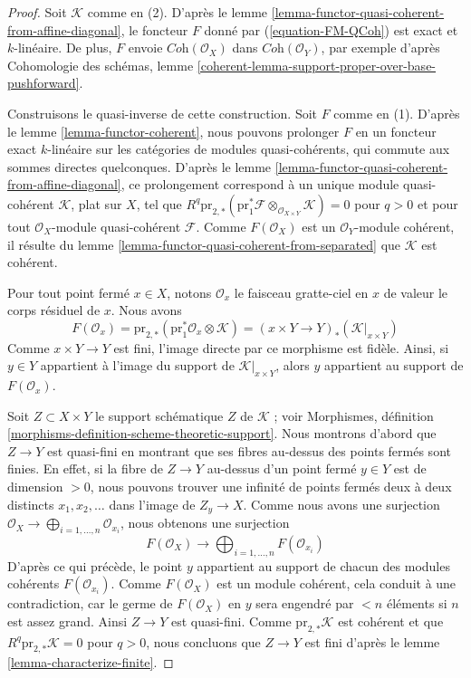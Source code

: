 \begin{proof}
Soit $\mathcal{K}$ comme en (2). D'après le
lemme \ref{lemma-functor-quasi-coherent-from-affine-diagonal}, le foncteur
$F$ donné par (\ref{equation-FM-QCoh}) est exact et $k$-linéaire.
De plus, $F$ envoie $\textit{Coh}(\mathcal{O}_X)$ dans
$\textit{Coh}(\mathcal{O}_Y)$, par exemple d'après
Cohomologie des schémas, lemme
\ref{coherent-lemma-support-proper-over-base-pushforward}.

\medskip\noindent
Construisons le quasi-inverse de cette construction. Soit $F$ comme en (1).
D'après le lemme \ref{lemma-functor-coherent}, nous pouvons prolonger $F$ en
un foncteur exact $k$-linéaire sur les catégories de modules quasi-cohérents,
qui commute aux sommes directes quelconques.
D'après le lemme \ref{lemma-functor-quasi-coherent-from-affine-diagonal}, ce
prolongement correspond à un unique module quasi-cohérent $\mathcal{K}$, plat
sur $X$, tel que
$R^q\text{pr}_{2, *}(\text{pr}_1^*\mathcal{F}
\otimes_{\mathcal{O}_{X \times Y}} \mathcal{K}) = 0$ pour $q > 0$
et pour tout $\mathcal{O}_X$-module quasi-cohérent $\mathcal{F}$.
Comme $F(\mathcal{O}_X)$ est un $\mathcal{O}_Y$-module cohérent, il résulte
du lemme \ref{lemma-functor-quasi-coherent-from-separated} que
$\mathcal{K}$ est cohérent.

\medskip\noindent
Pour tout point fermé $x \in X$, notons $\mathcal{O}_x$ le faisceau gratte-ciel
en $x$ de valeur le corps résiduel de $x$. Nous avons
$$
F(\mathcal{O}_x) =
\text{pr}_{2, *}(\text{pr}_1^*\mathcal{O}_x \otimes \mathcal{K}) =
(x \times Y \to Y)_*(\mathcal{K}|_{x \times Y})
$$
Comme $x \times Y \to Y$ est fini, l'image directe par ce morphisme est
fidèle. Ainsi, si $y \in Y$ appartient à l'image du support de
$\mathcal{K}|_{x \times Y}$, alors $y$ appartient au support de
$F(\mathcal{O}_x)$.

\medskip\noindent
Soit $Z \subset X \times Y$ le support schématique $Z$ de $\mathcal{K}$ ;
voir Morphismes, définition
\ref{morphisms-definition-scheme-theoretic-support}.
Nous montrons d'abord que $Z \to Y$ est quasi-fini en montrant que ses fibres
au-dessus des points fermés sont finies. En effet, si la fibre de $Z \to Y$
au-dessus d'un point fermé $y \in Y$ est de dimension $> 0$, nous pouvons
trouver une infinité de points fermés deux à deux distincts
$x_1, x_2, \ldots$ dans l'image de $Z_y \to X$. Comme nous avons une
surjection
$\mathcal{O}_X \to \bigoplus_{i = 1, \ldots, n} \mathcal{O}_{x_i}$,
nous obtenons une surjection
$$
F(\mathcal{O}_X) \to \bigoplus\nolimits_{i = 1, \ldots, n} F(\mathcal{O}_{x_i})
$$
D'après ce qui précède, le point $y$ appartient au support de chacun des
modules cohérents $F(\mathcal{O}_{x_i})$. Comme $F(\mathcal{O}_X)$ est un
module cohérent, cela conduit à une contradiction, car le germe de
$F(\mathcal{O}_X)$ en $y$ sera engendré par $< n$ éléments si
$n$ est assez grand.
Ainsi $Z \to Y$ est quasi-fini.
Comme $\text{pr}_{2, *}\mathcal{K}$ est cohérent et que
$R^q\text{pr}_{2, *}\mathcal{K} = 0$ pour $q > 0$, nous concluons que
$Z \to Y$ est fini d'après le lemme \ref{lemma-characterize-finite}.
\end{proof}

